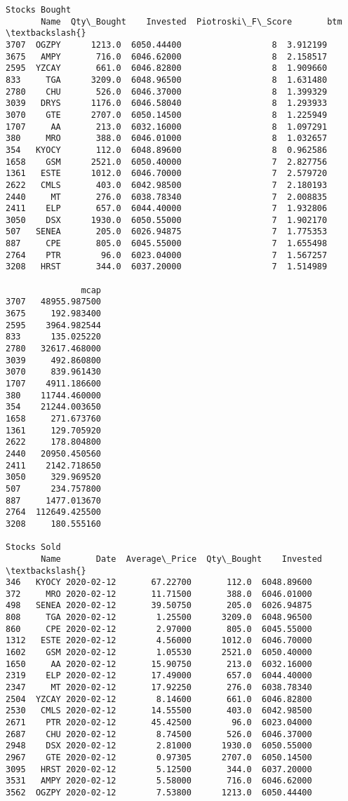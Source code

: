 \documentclass[11pt]{article}
\begin{document}
\begin{Verbatim}[commandchars=\\\{\}]
Stocks Bought
       Name  Qty\_Bought    Invested  Piotroski\_F\_Score       btm  \textbackslash{}
3707  OGZPY      1213.0  6050.44400                  8  3.912199
3675   AMPY       716.0  6046.62000                  8  2.158517
2595  YZCAY       661.0  6046.82800                  8  1.909660
833     TGA      3209.0  6048.96500                  8  1.631480
2780    CHU       526.0  6046.37000                  8  1.399329
3039   DRYS      1176.0  6046.58040                  8  1.293933
3070    GTE      2707.0  6050.14500                  8  1.225949
1707     AA       213.0  6032.16000                  8  1.097291
380     MRO       388.0  6046.01000                  8  1.032657
354   KYOCY       112.0  6048.89600                  8  0.962586
1658    GSM      2521.0  6050.40000                  7  2.827756
1361   ESTE      1012.0  6046.70000                  7  2.579720
2622   CMLS       403.0  6042.98500                  7  2.180193
2440     MT       276.0  6038.78340                  7  2.008835
2411    ELP       657.0  6044.40000                  7  1.932806
3050    DSX      1930.0  6050.55000                  7  1.902170
507   SENEA       205.0  6026.94875                  7  1.775353
887     CPE       805.0  6045.55000                  7  1.655498
2764    PTR        96.0  6023.04000                  7  1.567257
3208   HRST       344.0  6037.20000                  7  1.514989

               mcap
3707   48955.987500
3675     192.983400
2595    3964.982544
833      135.025220
2780   32617.468000
3039     492.860800
3070     839.961430
1707    4911.186600
380    11744.460000
354    21244.003650
1658     271.673760
1361     129.705920
2622     178.804800
2440   20950.450560
2411    2142.718650
3050     329.969520
507      234.757800
887     1477.013670
2764  112649.425500
3208     180.555160

Stocks Sold
       Name       Date  Average\_Price  Qty\_Bought    Invested  \textbackslash{}
346   KYOCY 2020-02-12       67.22700       112.0  6048.89600
372     MRO 2020-02-12       11.71500       388.0  6046.01000
498   SENEA 2020-02-12       39.50750       205.0  6026.94875
808     TGA 2020-02-12        1.25500      3209.0  6048.96500
860     CPE 2020-02-12        2.97000       805.0  6045.55000
1312   ESTE 2020-02-12        4.56000      1012.0  6046.70000
1602    GSM 2020-02-12        1.05530      2521.0  6050.40000
1650     AA 2020-02-12       15.90750       213.0  6032.16000
2319    ELP 2020-02-12       17.49000       657.0  6044.40000
2347     MT 2020-02-12       17.92250       276.0  6038.78340
2504  YZCAY 2020-02-12        8.14600       661.0  6046.82800
2530   CMLS 2020-02-12       14.55500       403.0  6042.98500
2671    PTR 2020-02-12       45.42500        96.0  6023.04000
2687    CHU 2020-02-12        8.74500       526.0  6046.37000
2948    DSX 2020-02-12        2.81000      1930.0  6050.55000
2967    GTE 2020-02-12        0.97305      2707.0  6050.14500
3095   HRST 2020-02-12        5.12500       344.0  6037.20000
3531   AMPY 2020-02-12        5.58000       716.0  6046.62000
3562  OGZPY 2020-02-12        7.53800      1213.0  6050.44400


\end{Verbatim}
\end{document}
